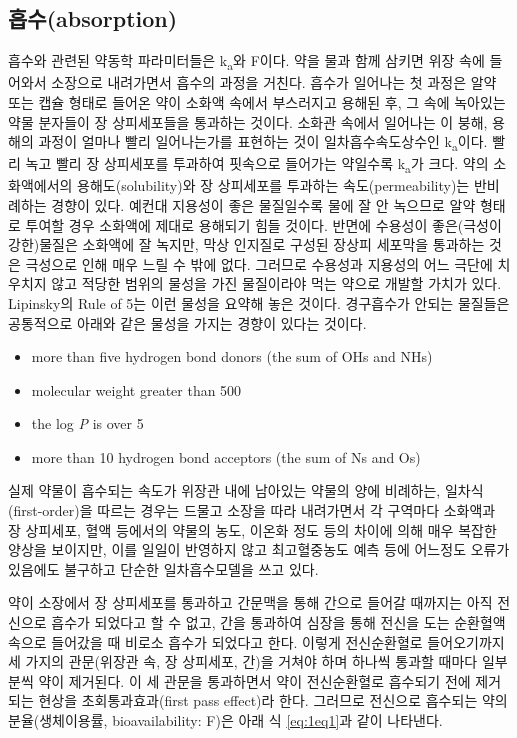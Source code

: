\documentclass[
  11pt,
  krantz2, a4paper, twoside]{krantz}
\providecommand{\tightlist}{%
  \setlength{\itemsep}{0pt}\setlength{\parskip}{0pt}}
\theoremstyle{definition}
\theoremstyle{definition}
\theoremstyle{definition}
\theoremstyle{definition}
\theoremstyle{remark}
\begin{document}
\hypertarget{uxd761uxc218absorption}{%
\subsection{흡수(absorption)}\label{uxd761uxc218absorption}}

흡수와 관련된 약동학 파라미터들은 k\textsubscript{a}와 F이다. 약을 물과 함께 삼키면 위장
속에 들어와서 소장으로 내려가면서 흡수의 과정을 거친다. 흡수가 일어나는
첫 과정은 알약 또는 캡슐 형태로 들어온 약이 소화액 속에서 부스러지고
용해된 후, 그 속에 녹아있는 약물 분자들이 장 상피세포들을 통과하는
것이다. 소화관 속에서 일어나는 이 붕해, 용해의 과정이 얼마나 빨리
일어나는가를 표현하는 것이 일차흡수속도상수인 k\textsubscript{a}이다. 빨리 녹고 빨리 장
상피세포를 투과하여 핏속으로 들어가는 약일수록 k\textsubscript{a}가 크다. 약의
소화액에서의 용해도(solubility)와 장 상피세포를 투과하는
속도(permeability)는 반비례하는 경향이 있다. 예컨대 지용성이 좋은
물질일수록 물에 잘 안 녹으므로 알약 형태로 투여할 경우 소화액에 제대로
용해되기 힘들 것이다. 반면에 수용성이 좋은(극성이 강한)물질은 소화액에
잘 녹지만, 막상 인지질로 구성된 장상피 세포막을 통과하는 것은 극성으로
인해 매우 느릴 수 밖에 없다. 그러므로 수용성과 지용성의 어느 극단에
치우치지 않고 적당한 범위의 물성을 가진 물질이라야 먹는 약으로 개발할
가치가 있다. Lipinsky의 Rule of 5는 이런 물성을 요약해 놓은 것이다.
경구흡수가 안되는 물질들은 공통적으로 아래와 같은 물성을 가지는 경향이
있다는 것이다.

\begin{itemize}
\tightlist
\item
  more than five hydrogen bond donors (the sum of OHs and NHs)
\item
  molecular weight greater than 500
\item
  the log \emph{P} is over 5
\item
  more than 10 hydrogen bond acceptors (the sum of Ns and Os)
\end{itemize}

실제 약물이 흡수되는 속도가 위장관 내에 남아있는 약물의 양에 비례하는,
일차식(first-order)을 따르는 경우는 드물고 소장을 따라 내려가면서 각
구역마다 소화액과 장 상피세포, 혈액 등에서의 약물의 농도, 이온화 정도
등의 차이에 의해 매우 복잡한 양상을 보이지만, 이를 일일이 반영하지 않고
최고혈중농도 예측 등에 어느정도 오류가 있음에도 불구하고 단순한
일차흡수모델을 쓰고 있다.

약이 소장에서 장 상피세포를 통과하고 간문맥을 통해 간으로 들어갈
때까지는 아직 전신으로 흡수가 되었다고 할 수 없고, 간을 통과하여 심장을
통해 전신을 도는 순환혈액 속으로 들어갔을 때 비로소 흡수가 되었다고
한다. 이렇게 전신순환혈로 들어오기까지 세 가지의 관문(위장관 속,
장 상피세포, 간)을 거쳐야 하며 하나씩 통과할 때마다 일부분씩 약이
제거된다. 이 세 관문을 통과하면서 약이 전신순환혈로 흡수되기 전에 제거되는
현상을 초회통과효과(first pass effect)라 한다. 그러므로 전신으로
흡수되는 약의 분율(생체이용률, bioavailability: F)은 아래 식 \eqref{eq:1eq1}과 같이 나타낸다.
\end{document}
